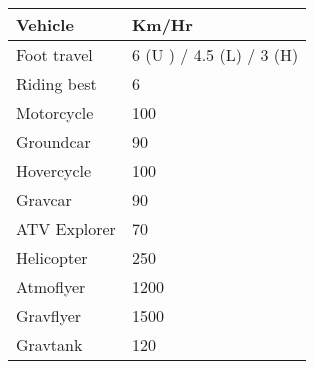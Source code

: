 \documentclass[10pt,letterpaper]{article}
\begin{document}
\begin{multicols}{3}
\begin{tabularx}{\columnwidth}{ | l | X | }
        \hline
        \textbf{Vehicle} & \textbf{Km/Hr} \\
        \hline
        Foot travel & 6 (U ) / 4.5 (L) / 3 (H) \\
        \hline
        Riding best & 6 \\
        \hline
        Motorcycle & 100 \\
        \hline
        Groundcar & 90 \\
        \hline
        Hovercycle & 100 \\
        \hline
        Gravcar & 90 \\
        \hline
        ATV Explorer & 70 \\
        \hline
        Helicopter & 250 \\
        \hline
        Atmoflyer & 1200 \\
        \hline
        Gravflyer & 1500 \\
        \hline
        Gravtank & 120 \\
        \hline
    \end{tabularx}
\end{multicols}
\end{document}
